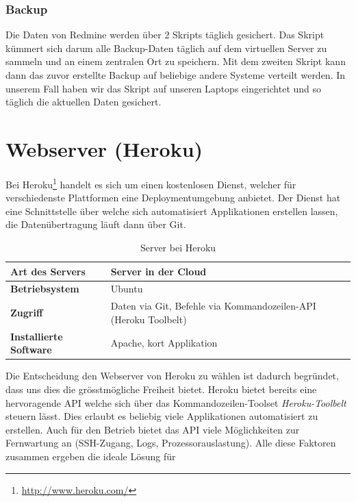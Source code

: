 \subsubsection{Backup}
Die Daten von Redmine werden über 2 Skripts täglich gesichert. 
Das Skript  kümmert sich darum alle Backup-Daten täglich auf dem virtuellen Server zu sammeln und an einem zentralen Ort zu speichern.
Mit dem zweiten Skript  kann dann das zuvor erstellte Backup auf beliebige andere Systeme verteilt werden.
In unserem Fall haben wir das Skript auf unseren Laptops eingerichtet und so täglich die aktuellen Daten gesichert.


\section{Webserver (Heroku)}

Bei Heroku\footnote{\url{http://www.heroku.com/}} handelt es sich um einen kostenlosen Dienst, welcher für verschiedenste Plattformen eine Deploymentumgebung anbietet. 
Der Dienst hat eine Schnittstelle über welche sich automatisiert Applikationen erstellen lassen, die Datenübertragung läuft dann über \gls{Git}.

\begin{table}[H]
\centering
\begin{tabular}{|p{0.25\twocelltabwidth}|p{0.75\twocelltabwidth}|}
\hline 
\small{\textbf{Art des Servers}} & Server in der \gls{Cloud} \\
\hline 
\small{\textbf{Betriebsystem}} & Ubuntu \\
\hline 
\small{\textbf{Zugriff}} & Daten via \gls{Git}, Befehle via Kommandozeilen-API (Heroku Toolbelt) \\
\hline 
\small{\textbf{Installierte Software}} & Apache, kort Applikation \\
\hline 
\end{tabular} 
\caption{Server bei Heroku}
\label{infrastruktur-heroku-tabelle}
\end{table}

Die Entscheidung den Webserver von Heroku zu wählen ist dadurch begründet, dass uns dies die grösstmögliche Freiheit bietet. 
Heroku bietet bereits eine hervoragende \gls{API} welche sich über das Kommandozeilen-Toolset \emph{Heroku-Toolbelt} steuern lässt.
Dies erlaubt es beliebig viele Applikationen automatisiert zu erstellen.
Auch für den Betrieb bietet das API viele Möglichkeiten zur Fernwartung an (SSH-Zugang, Logs, Prozessorauslastung).
Alle diese Faktoren zusammen ergeben die ideale Lösung für 

